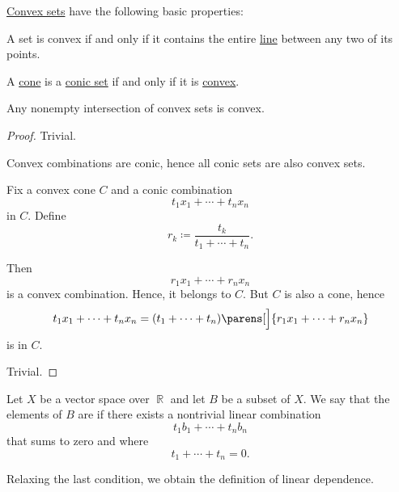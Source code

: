 \begin{proposition}\label{thm:def:convex_hull}
  \hyperref[def:convex_hull]{Convex sets} have the following basic properties:

  \begin{thmenum}
     A set is convex if and only if it contains the entire \hyperref[def:line_segment]{line} between any two of its points.

     A \hyperref[def:geometric_cone]{cone} is a \hyperref[def:convex_hull]{conic set} if and only if it is \hyperref[def:convex_hull]{convex}.

     Any nonempty intersection of convex sets is convex.
  \end{thmenum}
\end{proposition}
\begin{proof}
   Trivial.

  \SufficiencySubProof* Convex combinations are conic, hence all conic sets are also convex sets.

  \NecessitySubProof* Fix a convex cone \( C \) and a conic combination
  \begin{equation*}
    t_1 x_1 + \cdots + t_n x_n
  \end{equation*}
  in \( C \). Define
  \begin{equation*}
    r_k \coloneqq \frac {t_k} {t_1 + \cdots + t_n}.
  \end{equation*}

  Then
  \begin{equation*}
    r_1 x_1 + \cdots + r_n x_n
  \end{equation*}
  is a convex combination. Hence, it belongs to \( C \). But \( C \) is also a cone, hence
  \begin{equation*}
    t_1 x_1 + \cdots + t_n x_n = (t_1 + \cdots + t_n) \parens[\Big]{ r_1 x_1 + \cdots + r_n x_n }
  \end{equation*}
  is in \( C \).

   Trivial.
\end{proof}

\begin{definition}\label{def:affine_dependence}\mimprovised
  Let \( X \) be a vector space over \( \BbbR \) and let \( B \) be a subset of \( X \). We say that the elements of \( B \) are  if there exists a nontrivial linear combination
  \begin{equation*}
    t_1 b_1 + \cdots + t_n b_n
  \end{equation*}
  that sums to zero and where
  \begin{equation*}
    t_1 + \cdots + t_n = 0.
  \end{equation*}

  Relaxing the last condition, we obtain the definition of linear dependence.
\end{definition}

